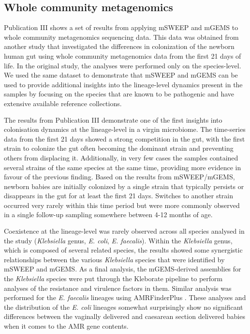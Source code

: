 \documentclass[officiallayout]{tktla}
\begin{document}
\subsection{Whole community metagenomics}

Publication III shows a set of results from applying mSWEEP and mGEMS
to whole community metagenomics sequencing data. This data was obtained from
another study \citep{shao2019stunted} that investigated the differences in
colonization of the newborn human gut using whole community metagenomics data from
the first 21 days of life. In the original study, the analyses were
performed only on the species-level. We used the same dataset to
demonstrate that mSWEEP and mGEMS can be used to provide additional
insights into the lineage-level dynamics present in the samples by
focusing on the species that are known to be pathogenic and have
extensive available reference collections.

The results from Publication III demonstrate one of the first insights into
colonisation dynamics at the lineage-level in a virgin microbiome. The
time-series data from the first 21 days showed a strong competition in
the gut, with the first strain to colonize the gut often becoming the
dominant strain and preventing others from displacing
it. Additionally, in very few cases the samples contained several
strains of the same species at the same time, providing more
evidence in favour of the previous finding. Based on the results from
mSWEEP/mGEMS, newborn babies are initially colonized by a single
strain that typically persists or disappears in the gut for at least
the first 21 days. Switches to another strain occurred very rarely
within this time period but were more commonly observed in a single
follow-up sampling somewhere between 4-12 months of age.

Coexistence at the lineage-level was rarely observed across all
species analysed in the study (\textit{Klebsiella} genus,
\textit{E. coli}, \textit{E. faecalis}). Within the
\textit{Klebsiella} genus, which is composed of several related
species, the results showed some synergistic relationships between the
various \textit{Klebsiella} species that were identified by mSWEEP and
mGEMS. As a final analysis, the mGEMS-derived assemblies for the
\textit{Klebsiella} species were put through the Kleborate
\citep{lam2021genomic} pipeline to perform analyses of the resistance
and virulence factors in them. Similar analysis was performed for the
\textit{E. faecalis} lineages using AMRFinderPlus
\citep{feldgarden2021amrfinderplus}. These analyses and the
distribution of the \textit{E. coli} lineages somewhat surprisingly
show no significant differences between the vaginally delivered and
caesarean section delivered babies when it comes to the AMR gene
contents.
\end{document}

